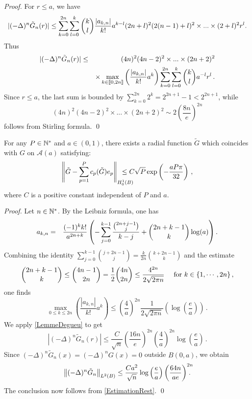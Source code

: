 \documentclass[smallextended]{svjour3}
\begin{document}
\begin{proof} For $r \leq a$, we have
	\[|(-\Delta)^n \tilde{G}_n(r)| \leq \sum_{k=0}^{2n}\sum_{l=0}^k \dbinom{k}{l}\dfrac{|a_{k,n}|}{k!}a^{k-l}(2n+l)^2(2(n-1)+l)^2\times ... \times (2+l)^2r^{l}.\]	
	Thus 
	\begin{eqnarray*}		
		|(-\Delta)^n \tilde{G}_n(r)| &\leq& (4n)^2(4n-2)^2 \times ... \times (2n+2)^2\\
		&&\times\max_{k\in\llbracket 0,2n\rrbracket}\left(\dfrac{|a_{k,n}|}{k!}a^k\right)\sum_{k=0}^{2n}\sum_{l=0}^k \dbinom{k}{l}a^{-l}r^l\,.	
	\end{eqnarray*}
	Since $r\leq a$, the last sum is bounded by $\displaystyle\sum_{k=0}^{2n}2^k = 2^{2n+1}-1 < 2^{2n+1}$,
	while 
	\[(4n)^2(4n-2)^2\times...\times (2n+2)^2 \sim 2\left(\dfrac{8n}{e}\right)^{2n}\]
	follows from Stirling formula. 
	\qed
\end{proof}
\begin{lemma}
	\label{The:DecroissanceErreurProlongementPoly}
	For any $P \in \mathbb{N}^*$ and $a \in (0,1)$, there exists a radial function $\tilde{G}$ which coincides with $G$ on $\mathcal{A}(a)$ satisfying:
	\[\norm{\tilde{G} - \sum_{p=1}^{P}c_p(\tilde{G})e_p}_{H^1_0(B)} \hspace{-0.7cm}\leq C \sqrt{P} \exp\left(-\frac{aP\pi}{32}\right)\,,\]
	where $C$ is a positive constant independent of $P$ and $a$. 
\end{lemma}
\begin{proof}
	Let $n \in \mathbb{N}^*$. By the Leibniz formula, one has
	\begin{eqnarray*}						
		a_{k,n} & = & \dfrac{(-1)^k k!}{a^{2n+k}}  \left(-\displaystyle\sum_{j=0}^{k-1}\dfrac{\binom{2n+j-1}{j}}{k-j}+\dbinom{2n+k-1}{k}\log(a)\right). \\
	\end{eqnarray*}
	Combining the identity $\sum_{j=0}^{k-1}\binom{j+2n-1}{j} = \frac{k}{2n}\binom{k+2n-1}{k}$
	and the estimate
	\begin{equation*}
		\dbinom{2n+k-1}{k}\leq \dbinom{4n-1}{2n} = \frac{1}{2}\dbinom{4n}{2n} \leq \dfrac{4^{2n}}{2\sqrt{2\pi n}} \quad \text{ for } k \in \{1,\cdots,2n\}\,,
	\end{equation*}
	one finds
	\begin{equation}
		\max_{0\leq k \leq 2n}\left(\dfrac{|a_{k,n}|}{k!}a^k\right) \leq \left(\frac{4}{a}\right)^{2n}\dfrac{1}{2\sqrt{2\pi n}}\left(\log\left(\frac{e}{a}\right)\right)\,.
		\label{majorAkLog} 
	\end{equation}							
	We apply \autoref{LemmeDegueu} to get
	\[|(-\Delta)^n \tilde{G}_n (r)|\leq \dfrac{C}{\sqrt{n}}\left( \frac{16n}{e}\right)^{2n}\left(\frac{4}{a}\right)^{2n}\log\left(\dfrac{e}{a}\right)\,.\]
	Since $(-\Delta)^n \tilde{G}_n(x) = (-\Delta)^n G(x) = 0$ outside $B(0,a)$, we obtain
	\[ \left\|(-\Delta)^n \tilde{G}_n\right\|_{L^2(B)} \leq \dfrac{C a^2}{\sqrt{n}}\log\left(\frac{e}{a}\right)\left( \frac{64n}{ae}\right)^{2n}\!\!\!\!\!\!\,.\]
	The conclusion now follows from \autoref{EstimationRest}. 
	\qed
\end{proof}
\end{document}
